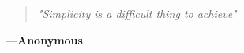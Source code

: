 \thispagestyle{empty}
\vspace*{0.4\textwidth}
\begin{quote}
\textit{\large "Simplicity is a difficult thing to achieve"}
\end{quote}
{\hspace*{\fill} —\textbf{Anonymous}}
\newpage
